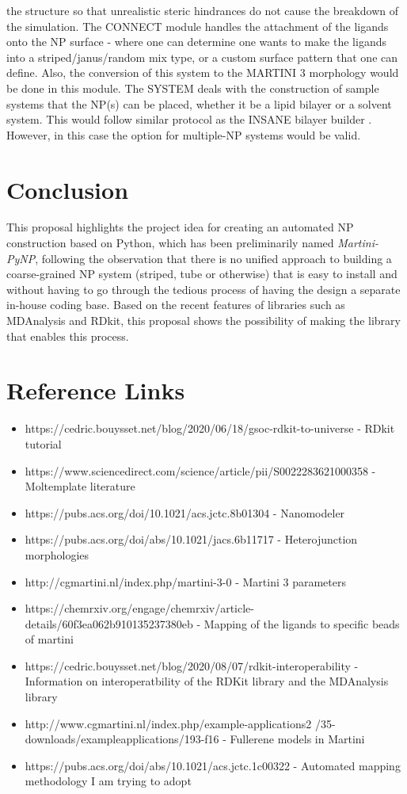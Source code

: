 \documentclass[12pt]{article}
\begin{document}
the structure so that unrealistic steric hindrances do not cause the breakdown of the simulation. The CONNECT module handles the attachment of the ligands
onto the NP surface - where one can determine one wants to make the ligands into a striped/janus/random mix type, or a custom surface pattern that one can define. Also,
the conversion of this system to the MARTINI 3 morphology would be done in this module. The SYSTEM deals with the construction of sample systems that the NP(s) can be placed, whether it be a lipid bilayer or a solvent system. This would follow similar protocol as the INSANE bilayer builder \cite{INSANE}. However, in this case the option for multiple-NP systems would be valid.

\cite{Automated}
\section{Conclusion}
This proposal highlights the project idea for creating an automated NP construction based on Python, which has been preliminarily named \emph{Martini-PyNP},
following the observation that there is no unified approach to building a coarse-grained NP system (striped, tube or otherwise) that is easy to install and without having to
go through the tedious process of having the design a separate in-house coding base. Based on the recent features of libraries such as MDAnalysis and RDkit, this proposal shows the possibility
of making the library that enables this process. 
\section{Reference Links}
\begin{itemize}
\item https://cedric.bouysset.net/blog/2020/06/18/gsoc-rdkit-to-universe - RDkit tutorial
\item https://www.sciencedirect.com/science/article/pii/S0022283621000358 - Moltemplate literature
\item https://pubs.acs.org/doi/10.1021/acs.jctc.8b01304 - Nanomodeler
\item https://pubs.acs.org/doi/abs/10.1021/jacs.6b11717 - Heterojunction morphologies 
\item http://cgmartini.nl/index.php/martini-3-0 - Martini 3 parameters
\item https://chemrxiv.org/engage/chemrxiv/article-details/60f3ea062b910135237380eb - Mapping of the ligands to specific beads of martini
\item https://cedric.bouysset.net/blog/2020/08/07/rdkit-interoperability - Information on interoperatbility of the RDKit library and the MDAnalysis library
\item http://www.cgmartini.nl/index.php/example-applications2
  /35-downloads/exampleapplications/193-f16 - Fullerene models in Martini
\item https://pubs.acs.org/doi/abs/10.1021/acs.jctc.1c00322 - Automated mapping methodology I am trying to adopt 
\end{itemize}



\end{document}
